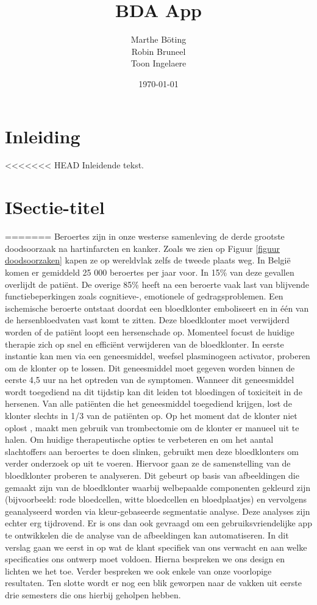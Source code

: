 \documentclass[a4paper,kulak]{kulakarticle}
\date{\today}
\title{BDA App}
\author{Marthe B\"{o}ting\\
	Robin Bruneel\\
	Toon Ingelaere}
\begin{document}
	
	
	\maketitle

\section*{Inleiding}

<<<<<<< HEAD
Inleidende tekst.

\tableofcontents

\section{ISectie-titel}
=======
Beroertes zijn in onze westerse samenleving de derde grootste doodsoorzaak na hartinfarcten en kanker. Zoals we zien op Figuur \ref{figuur doodsoorzaken} kapen ze op wereldvlak zelfs de tweede plaats weg\cite{worldhealthorganization}. In België komen er gemiddeld 25 000 beroertes per jaar voor. In 15\% van deze gevallen overlijdt de patiënt. De overige 85\% heeft na een beroerte vaak last van blijvende functiebeperkingen zoals cognitieve-, emotionele of gedragsproblemen. Een ischemische beroerte ontstaat doordat een bloedklonter emboliseert en in één van de hersenbloedvaten vast komt te zitten. Deze bloedklonter moet verwijderd worden of de patiënt loopt een hersenschade op.
Momenteel focust de huidige therapie zich op snel en efficiënt verwijderen van de bloedklonter. In eerste instantie kan men via een geneesmiddel, weefsel plasminogeen activator, proberen om de klonter op te lossen. Dit geneesmiddel moet gegeven worden binnen de eerste 4,5 uur na het optreden van de symptomen. Wanneer dit geneesmiddel wordt toegediend na dit tijdstip kan dit leiden tot bloedingen of toxiciteit in de hersenen. Van alle patiënten die het geneesmiddel toegediend krijgen, lost de klonter slechts in 1/3 van de patiënten op.
Op het moment dat de klonter niet oplost , maakt men gebruik van trombectomie om de klonter er manueel uit te halen.
Om huidige therapeutische opties te verbeteren en om het aantal slachtoffers aan beroertes te doen slinken, gebruikt men deze bloedklonters om verder onderzoek op uit te voeren. Hiervoor gaan ze de samenstelling van de bloedklonter proberen te analyseren. Dit gebeurt op basis van afbeeldingen die gemaakt zijn van de bloedklonter waarbij welbepaalde componenten gekleurd zijn (bijvoorbeeld: rode bloedcellen, witte bloedcellen en bloedplaatjes) en vervolgens geanalyseerd worden via kleur-gebaseerde segmentatie analyse.
Deze analyses zijn echter erg tijdrovend. Er is ons dan ook gevraagd om een gebruiksvriendelijke app te ontwikkelen die de analyse van de afbeeldingen kan automatiseren.
In dit verslag gaan we eerst in op wat de klant specifiek van ons verwacht en aan welke specificaties ons ontwerp moet voldoen. Hierna bespreken we ons design en lichten we het toe. Verder bespreken we ook enkele van onze voorlopige resultaten. Ten slotte wordt er nog een blik geworpen naar de vakken uit eerste drie semesters die ons hierbij geholpen hebben.
\end{document}
